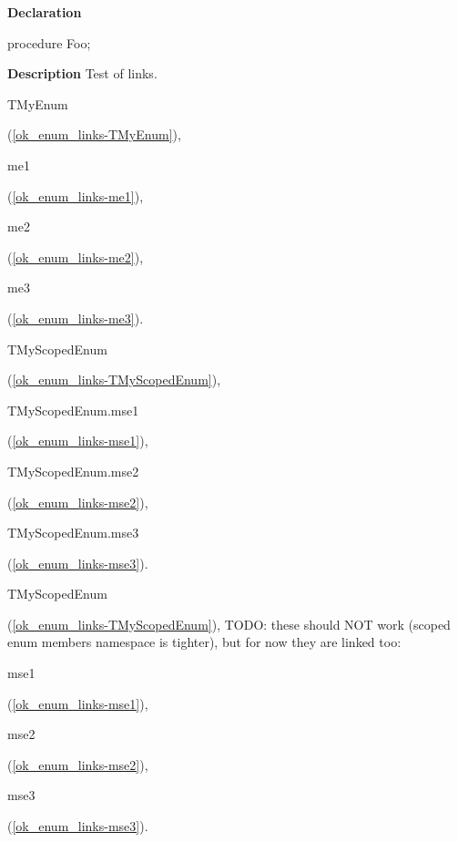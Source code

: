 \documentclass{report}
\begin{document}
\begin{list}{}{
\setlength{\itemindent}{0cm}
\setlength{\listparindent}{0cm}
\setlength{\leftmargin}{\evensidemargin}
\addtolength{\leftmargin}{\tmplength}
\settowidth{\labelsep}{X}
\addtolength{\leftmargin}{\labelsep}
\setlength{\labelwidth}{\tmplength}
}
\begin{flushleft}
\item[\textbf{Declaration}\hfill]
\begin{ttfamily}
procedure Foo;\end{ttfamily}


\end{flushleft}
\par
\item[\textbf{Description}]
Test of links.

\begin{ttfamily}TMyEnum\end{ttfamily}(\ref{ok_enum_links-TMyEnum}), \begin{ttfamily}me1\end{ttfamily}(\ref{ok_enum_links-me1}), \begin{ttfamily}me2\end{ttfamily}(\ref{ok_enum_links-me2}), \begin{ttfamily}me3\end{ttfamily}(\ref{ok_enum_links-me3}).

\begin{ttfamily}TMyScopedEnum\end{ttfamily}(\ref{ok_enum_links-TMyScopedEnum}), \begin{ttfamily}TMyScopedEnum.mse1\end{ttfamily}(\ref{ok_enum_links-mse1}), \begin{ttfamily}TMyScopedEnum.mse2\end{ttfamily}(\ref{ok_enum_links-mse2}), \begin{ttfamily}TMyScopedEnum.mse3\end{ttfamily}(\ref{ok_enum_links-mse3}).

\begin{ttfamily}TMyScopedEnum\end{ttfamily}(\ref{ok_enum_links-TMyScopedEnum}), TODO: these should NOT work (scoped enum members namespace is tighter), but for now they are linked too: \begin{ttfamily}mse1\end{ttfamily}(\ref{ok_enum_links-mse1}), \begin{ttfamily}mse2\end{ttfamily}(\ref{ok_enum_links-mse2}), \begin{ttfamily}mse3\end{ttfamily}(\ref{ok_enum_links-mse3}).

\end{list}
\end{document}
